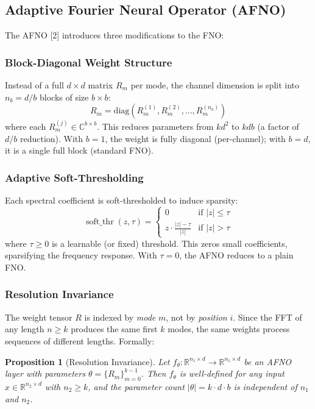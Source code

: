\documentclass[11pt,a4paper]{article}
\newtheorem{proposition}{Proposition}
\theoremstyle{definition}
\theoremstyle{remark}
\newcommand{\R}{\mathbb{R}}
\newcommand{\C}{\mathbb{C}}
\newcommand{\abs}[1]{\left\lvert#1\right\rvert}
\newcommand{\softthr}{\operatorname{soft\_thr}}
\begin{document}
\subsection{Adaptive Fourier Neural Operator (AFNO)}

The AFNO [2] introduces three modifications to the FNO:

\subsubsection{Block-Diagonal Weight Structure}
Instead of a full $d \times d$ matrix $R_m$ per mode, the channel dimension is split
into $n_b = d / b$ blocks of size $b \times b$:
\begin{equation}
  R_m = \text{diag}(R_m^{(1)}, R_m^{(2)}, \ldots, R_m^{(n_b)})
  \label{eq:blockdiag}
\end{equation}
where each $R_m^{(j)} \in \C^{b \times b}$. This reduces parameters from
$k d^2$ to $k d b$ (a factor of $d/b$ reduction). With $b=1$, the weight is fully
diagonal (per-channel); with $b=d$, it is a single full block (standard FNO).

\subsubsection{Adaptive Soft-Thresholding}
Each spectral coefficient is soft-thresholded to induce sparsity:
\begin{equation}
  \softthr(z, \tau) = \begin{cases}
    0 & \text{if } \abs{z} \leq \tau \\
    z \cdot \frac{\abs{z} - \tau}{\abs{z}} & \text{if } \abs{z} > \tau
  \end{cases}
  \label{eq:soft_threshold}
\end{equation}
where $\tau \geq 0$ is a learnable (or fixed) threshold. This zeros small
coefficients, sparsifying the frequency response. With $\tau = 0$, the AFNO reduces
to a plain FNO.

\subsubsection{Resolution Invariance}
The weight tensor $R$ is indexed by \emph{mode} $m$, not by \emph{position} $i$.
Since the FFT of any length $n \geq k$ produces the same first $k$ modes, the same
weights process sequences of different lengths. Formally:
\begin{proposition}[Resolution Invariance]
\label{prop:resinv}
Let $f_\theta : \R^{n_1 \times d} \to \R^{n_1 \times d}$ be an AFNO layer with
parameters $\theta = \{R_m\}_{m=0}^{k-1}$. Then $f_\theta$ is well-defined for any
input $x \in \R^{n_2 \times d}$ with $n_2 \geq k$, and the parameter count
$\abs{\theta} = k \cdot d \cdot b$ is independent of $n_1$ and $n_2$.
\end{proposition}
\end{document}
